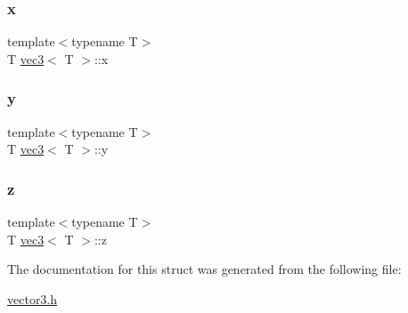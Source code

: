 \subsubsection{\texorpdfstring{x}{x}}
{\footnotesize\ttfamily template$<$typename T$>$ \\
T \mbox{\hyperlink{structvec3}{vec3}}$<$ T $>$\+::x}

\mbox{\label{structvec3_a77c2f238c0b2b7895304f5ca64b8d770}} 
\subsubsection{\texorpdfstring{y}{y}}
{\footnotesize\ttfamily template$<$typename T$>$ \\
T \mbox{\hyperlink{structvec3}{vec3}}$<$ T $>$\+::y}

\mbox{\label{structvec3_a7879033e3409225479ae0079c92d9afd}} 
\subsubsection{\texorpdfstring{z}{z}}
{\footnotesize\ttfamily template$<$typename T$>$ \\
T \mbox{\hyperlink{structvec3}{vec3}}$<$ T $>$\+::z}



The documentation for this struct was generated from the following file\+:\begin{DoxyCompactItemize}
\item 
\mbox{\hyperlink{vector3_8h}{vector3.\+h}}\end{DoxyCompactItemize}
